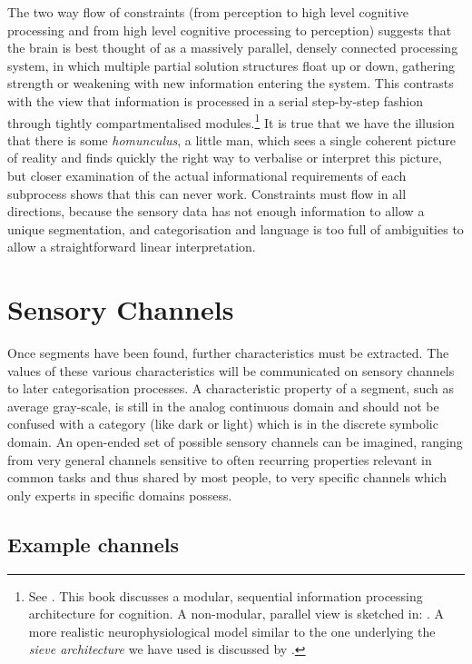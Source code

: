 The two way flow of constraints (from perception to 
high level cognitive processing and from high level 
cognitive processing to perception) suggests 
that the brain is best thought of as a massively parallel, 
densely connected processing system, in which multiple 
partial solution structures float up or down, gathering strength 
or weakening with new information entering the system. 
This contrasts with the view that 
information is processed in a serial step-by-step fashion
through tightly compartmentalised modules.\footnote{
See \cite{Fodor:1983}. This book discusses a modular, sequential 
information processing architecture for cognition. A 
non-modular, parallel view 
is sketched in: \cite{Minsky:1985}. 
A more realistic neurophysiological model similar to the 
one underlying the {\it sieve architecture} we have used is
discussed by \cite{Edelman:1987}.} It is true
that we have the illusion that there 
is some {\itshape homunculus}, a little man, which sees a single coherent 
picture of reality and finds quickly the right way to 
verbalise or interpret this picture, but closer examination 
of the actual informational requirements of each subprocess
shows that this can never work. Constraints must flow in all 
directions, because the sensory data has not enough information to allow 
a unique segmentation, and categorisation and language is 
too full of ambiguities to allow a straightforward linear
interpretation. 

\section{Sensory Channels}

Once segments have been found, further characteristics must
be extracted. The values of these various characteristics
will be communicated on sensory channels to later categorisation
processes. A characteristic property of a segment, such as 
average gray-scale, is still in the
analog continuous domain and should not be confused with
a category (like dark or light) which is in the
discrete symbolic domain. An open-ended set of possible sensory 
channels can be imagined, ranging from very general 
channels sensitive to often recurring properties relevant
in common tasks and thus shared by most people, to very 
specific channels which only experts in specific
domains possess. 

\subsection{Example channels}

